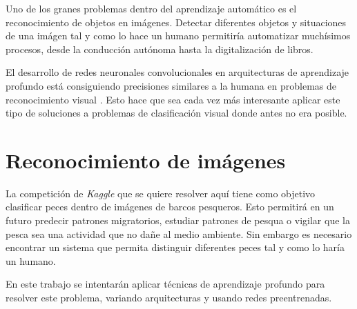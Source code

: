 Uno de los granes problemas dentro del aprendizaje automático es
el reconocimiento de objetos en imágenes. Detectar diferentes 
objetos y situaciones de una imágen tal y como lo hace un humano
permitiría automatizar muchísimos procesos, desde la conducción
autónoma hasta la digitalización de libros.

El desarrollo de redes neuronales convolucionales en arquitecturas de
aprendizaje profundo está consiguiendo precisiones similares a la humana en
problemas de reconocimiento visual \parencite{taigman}. Esto hace que sea cada
vez más interesante aplicar este tipo de soluciones a problemas de
clasificación visual donde antes no era posible.

\section{Reconocimiento de imágenes}

La competición de \textit{Kaggle} que se quiere resolver aquí tiene como
objetivo clasificar peces dentro de imágenes de barcos pesqueros. Esto
permitirá en un futuro predecir patrones migratorios, estudiar patrones de
pesqua o vigilar que la pesca sea una actividad que no dañe al medio ambiente.
Sin embargo es necesario encontrar un sistema que permita distinguir diferentes
peces tal y como lo haría un humano.

En este trabajo se intentarán aplicar técnicas de aprendizaje profundo para
resolver este problema, variando arquitecturas y usando redes preentrenadas. 

